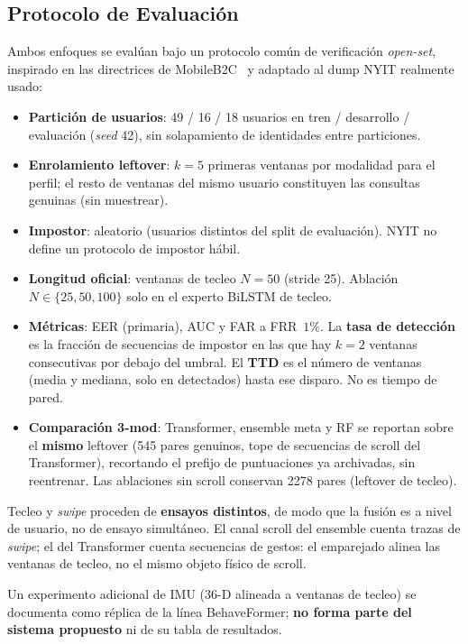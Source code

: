 \subsection{Protocolo de Evaluación}

Ambos enfoques se evalúan bajo un protocolo común de verificación \textit{open-set}, inspirado en las 
directrices de MobileB2C~\cite{stragapede2022mobileb2c} y adaptado al dump NYIT realmente usado:

\begin{itemize}
    \item \textbf{Partición de usuarios}: 49 / 16 / 18 usuarios en tren / desarrollo / evaluación 
    (\textit{seed} 42), sin solapamiento de identidades entre particiones.
    \item \textbf{Enrolamiento leftover}: $k=5$ primeras ventanas por modalidad para el perfil; 
    el resto de ventanas del mismo usuario constituyen las consultas genuinas (sin muestrear).
    \item \textbf{Impostor}: aleatorio (usuarios distintos del split de evaluación). NYIT no define 
    un protocolo de impostor hábil.
    \item \textbf{Longitud oficial}: ventanas de tecleo $N=50$ (stride 25). Ablación $N\in\{25,50,100\}$ 
    solo en el experto BiLSTM de tecleo.
    \item \textbf{Métricas}: EER (primaria), AUC y FAR a FRR~$1\%$. La \textbf{tasa de detección} es la
    fracción de secuencias de impostor en las que hay $k=2$ ventanas consecutivas por debajo del umbral.
    El \textbf{TTD} es el número de ventanas (media y mediana, solo en detectados) hasta ese disparo.
    No es tiempo de pared.
    \item \textbf{Comparación 3-mod}: Transformer, ensemble meta y RF se reportan sobre el \textbf{mismo}
    leftover (545 pares genuinos, tope de secuencias de scroll del Transformer), recortando el prefijo de
    puntuaciones ya archivadas, sin reentrenar. Las ablaciones sin scroll conservan 2278 pares (leftover de tecleo).
\end{itemize}

Tecleo y \textit{swipe} proceden de \textbf{ensayos distintos}, de modo que la fusión es a nivel de usuario, 
no de ensayo simultáneo. El canal scroll del ensemble cuenta trazas de \textit{swipe}; el del Transformer cuenta
secuencias de gestos: el emparejado alinea las ventanas de tecleo, no el mismo objeto físico de scroll.

Un experimento adicional de IMU (36-D alineada a ventanas de tecleo) se documenta como réplica de la línea 
BehaveFormer; \textbf{no forma parte del sistema propuesto} ni de su tabla de resultados.


